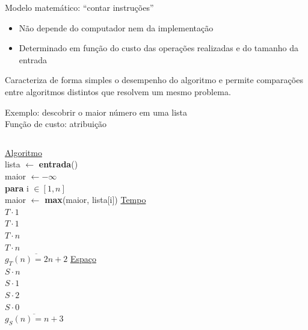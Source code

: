 \begin{frame}[label=main]
	Modelo matemático: ``contar instruções'' 
		\begin{itemize}
			\item Não depende do computador nem da implementação
			\item Determinado em função do custo das operações realizadas e do
			tamanho da entrada
		\end{itemize}
	\pause \vfill
	Caracteriza de forma simples o desempenho do algoritmo e permite comparações 
	entre algoritmos distintos que resolvem um mesmo problema.
\end{frame}

\begin{frame}[label=main]
	Exemplo: descobrir o maior número em uma lista
	\\\vfill\pause
	Função de custo: \alert{atribuição}
	\vfill\pause
	\begin{columns}[T]
			\underline{Algoritmo} \\
			lista $\gets$ \textbf{entrada}()\\
			maior $\gets -\infty$\\
			\textbf{para} i $\in [1,n]$ \\
			\hspace{1em}maior $\gets$ \textbf{max}(maior, lista[i])
			\pause
			\underline{Tempo} \\
			$T\cdot 1$ \\
			$T\cdot 1$ \\
			$T\cdot n$ \\
			$T\cdot n$\\
			\pause
			$\overline{g_T(n)=2n+2}$
		\pause
			\underline{Espaço} \\
			$S{\cdot}n$ \\
			$S{\cdot}1$ \\
			$S{\cdot}2$ \\
			$S{\cdot}0$ \\
			\pause
			$\overline{g_S(n)=n+3}$
	\end{columns}
\end{frame}

